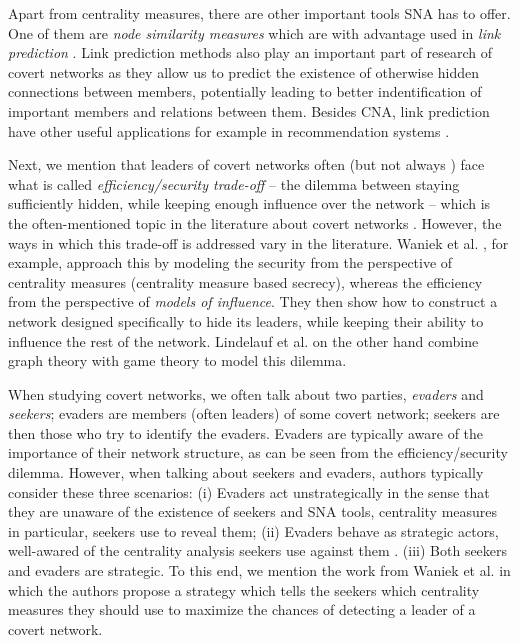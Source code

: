Apart from centrality measures, there are other important tools SNA has to offer.
One of them are \emph{node similarity measures} which are with advantage used in \emph{link prediction} \cite{Zhou2009,Wang2014}.
Link prediction methods also play an important part of research of covert networks
as they allow us to predict the existence of otherwise hidden connections between members, potentially leading to
better indentification of important members and relations between them.
Besides CNA, link prediction have other useful applications for example in recommendation systems \cite{Huang2005,Talasu2017}.

Next, we mention that leaders of covert networks often (but not always \cite{Fatih2012}) face what is called
\emph{efficiency/security trade-off} \cite{Morselli2007} --
the dilemma between staying sufficiently hidden, while keeping enough influence over the network --
which is the often-mentioned topic in the literature about covert networks \cite{Crossley2012,Waniek2017,Lindelauf2009}.
However, the ways in which this trade-off is addressed vary in the literature.
Waniek et al. \cite{Waniek2017}, for example, approach this by modeling the security from the perspective of
centrality measures (centrality measure based secrecy), whereas the efficiency from the perspective of \emph{models of influence}.
They then show how to construct a network designed specifically to hide its leaders, while
keeping their ability to influence the rest of the network.
Lindelauf et al. \cite{Lindelauf2009} on the other hand combine graph theory with game theory to model this dilemma.

When studying covert networks, we often talk about two parties, \emph{evaders} and \emph{seekers};
evaders are members (often leaders) of some covert network;
seekers are then those who try to identify the evaders.
Evaders are typically aware of the importance of their network structure, as can be seen from
the efficiency/security dilemma.
However, when talking about seekers and evaders, authors typically consider these three scenarios:
(i) Evaders act unstrategically in the sense that they are unaware of
the existence of seekers and SNA tools, centrality measures in particular, seekers use to reveal them;
(ii) Evaders behave as strategic actors, well-awared of the centrality analysis seekers use against them \cite{Waniek2017,Dey2019,Dey2020}.
(iii) Both seekers and evaders are strategic.
To this end, we mention the work from Waniek et al. \cite[y.~2021]{Waniek2021} in which the authors propose
a strategy which tells the seekers which centrality measures they should use to maximize the chances of detecting
a leader of a covert network.


